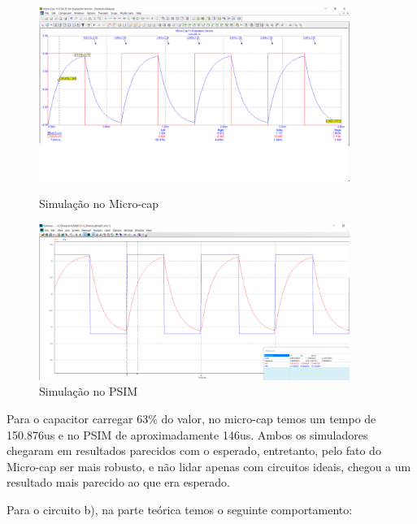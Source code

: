     \begin{figure}[!htb]
    \begin{minipage}{0.5\textwidth}
    \centering
    \includegraphics[width = 0.9\textwidth]{Relatorio1_microcap_Tau.png}
    \caption{Simulação no Micro-cap\cite{microcap}}
    \end{minipage}\hfill
    \begin{minipage}{0.5\textwidth}
    \centering
    \includegraphics[width = 0.9\textwidth]{Relatorio1_PSIM_Tau.png}
    \caption{Simulação no PSIM\cite{psim}}
    \end{minipage}\hfill
\end{figure}

Para o capacitor carregar 63\% do valor, no micro-cap temos um tempo de 150.876us e no PSIM de aproximadamente 146us. Ambos os simuladores chegaram em resultados parecidos com o esperado, entretanto, pelo fato do Micro-cap ser mais robusto, e não lidar apenas com circuitos ideais, chegou a um resultado mais parecido ao que era esperado.
    
\clearpage
    Para o circuito b), na parte teórica temos o seguinte comportamento:
    
